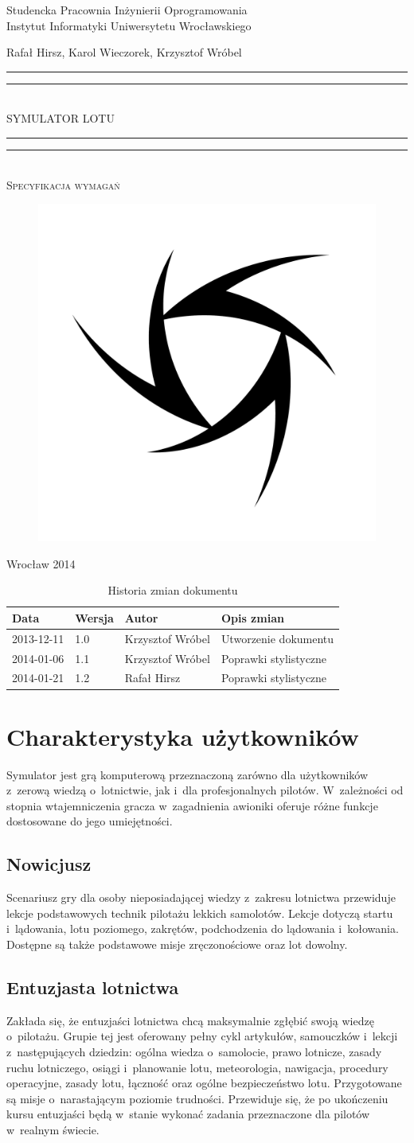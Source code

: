 \documentclass{mwrep}
\newcommand*{\titleGP}{\begingroup
\centering

{\large Studencka Pracownia Inżynierii Oprogramowania}\\Instytut Informatyki Uniwersytetu Wrocławskiego\par
\vspace*{16\baselineskip}

{\Large Rafał Hirsz, Karol Wieczorek, Krzysztof Wróbel\par}
\vspace*{\baselineskip}

\rule{\textwidth}{1.6pt}\vspace*{-\baselineskip}\vspace*{2pt}
\rule{\textwidth}{0.4pt}\\[\baselineskip]

{\Huge SYMULATOR LOTU}\\[0.2\baselineskip]

\rule{\textwidth}{0.4pt}\vspace*{-\baselineskip}\vspace{3.2pt}
\rule{\textwidth}{1.6pt}\\[\baselineskip]

\scshape
{\huge Specyfikacja wymagań}\par
\vspace*{2\baselineskip}

\begin{figure}[h]
\centering
\includegraphics[width=5\baselineskip]{flightsim-team-logo.pdf}
\end{figure}
\vfill

{\large Wrocław 2014}\par

\pagebreak

\endgroup}
\begin{document}
\thispagestyle{empty}
\titleGP

\begin{center}
\begin{table}[h]
\begin{center}
\caption{Historia zmian dokumentu}\label{T:Zmiany}
\vspace{3ex}
\begin{tabularx}{1\textwidth}{|l|l|l|X|}
\hline
Data & Wersja & Autor & Opis zmian \\ \hline
2013-12-11 & 1.0 & Krzysztof Wróbel & Utworzenie dokumentu \\
2014-01-06 & 1.1 & Krzysztof Wróbel & Poprawki stylistyczne \\
2014-01-21 & 1.2 & Rafał Hirsz & Poprawki stylistyczne \\
\hline
\end{tabularx}
\end{center}
\end{table}
\end{center}

\pagebreak

\tableofcontents

\chapter{Charakterystyka użytkowników}

Symulator jest grą komputerową przeznaczoną zarówno dla użytkowników z~zerową wiedzą o~lotnictwie, jak i~dla profesjonalnych pilotów. W~zależności od stopnia wtajemniczenia gracza w~zagadnienia awioniki oferuje różne funkcje dostosowane do jego umiejętności.

\section{Nowicjusz}

Scenariusz gry dla osoby nieposiadającej wiedzy z~zakresu lotnictwa przewiduje lekcje podstawowych technik pilotażu lekkich samolotów. Lekcje dotyczą startu i~lądowania, lotu poziomego, zakrętów, podchodzenia do lądowania i~kołowania. Dostępne są także podstawowe misje zręczonościowe oraz lot dowolny.

\section{Entuzjasta lotnictwa}

Zakłada się, że entuzjaści lotnictwa chcą maksymalnie zgłębić swoją wiedzę o~pilotażu. Grupie tej jest oferowany pełny cykl artykułów, samouczków i~lekcji z~następujących dziedzin: ogólna wiedza o~samolocie, prawo lotnicze, zasady ruchu lotniczego, osiągi i~planowanie lotu, meteorologia, nawigacja, procedury operacyjne, zasady lotu, łączność oraz ogólne bezpieczeństwo lotu. Przygotowane są misje o~narastającym poziomie trudności. Przewiduje się, że po ukończeniu kursu entuzjaści będą w~stanie wykonać zadania przeznaczone dla pilotów w~realnym świecie.
\end{document}
